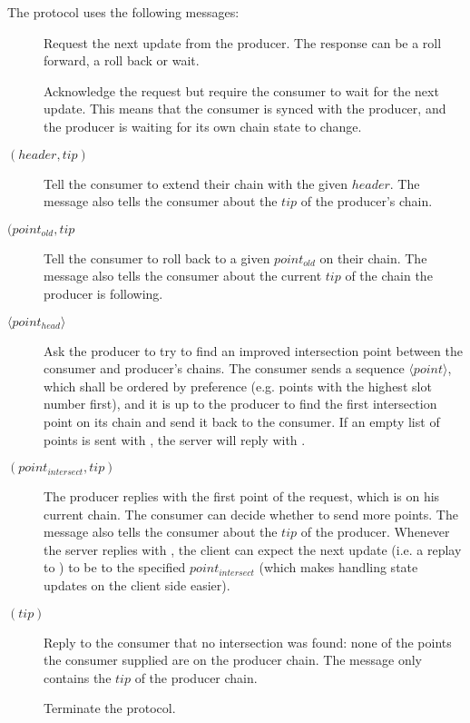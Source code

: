 The protocol uses the following messages:
\begin{description}
\item [\MsgRequestNext]
      Request the next update from the producer.  The response can be a roll
      forward, a roll back or wait.
\item [\MsgAwaitReply]
      Acknowledge the request but require the consumer to wait for the next update.
      This means that the consumer is synced with the producer, and
      the producer is waiting for its own chain state to change.
\item [\MsgRollForward{} {\boldmath $(header, tip)$}]
      Tell the consumer to extend their chain with the given $header$.
      The message also tells the consumer about the $tip$ of the producer's chain.
\item [\MsgRollBackward{} {\boldmath $(point_{old}, tip$}]
      Tell the consumer to roll back to a given $point_{old}$ on their chain.
      The message also tells the consumer about the current  $tip$ of the chain the producer is following.
\item [\MsgFindIntersect{} {\boldmath $\langle point_{head} \rangle $}]
      Ask the producer to try to find an improved intersection point between
      the consumer and producer's chains.
      The consumer sends a sequence {\boldmath $\langle point \rangle $}, which
      shall be ordered by preference (e.g. points with the highest slot number
      first), and it is up to the producer to find the first intersection point
      on its chain and send it back to the consumer.  If an empty list of
      points is sent with \MsgFindIntersect{}, the server will reply with
      \MsgIntersectNotFound{}.
\item [\MsgIntersectFound{} {\boldmath $(point_{intersect} ,tip)$}]
      The producer replies with the first point of the request, which is on his current chain.
      The consumer can decide whether to send more points.
      The message also tells the consumer about the $tip$ of the producer.
      Whenever the server replies with \MsgIntersectFound{}, the client can
      expect the next update (i.e. a replay to \MsgRequestNext{}) to be
      \MsgRollBackward{} to the specified $point_{intersect}$ (which makes
      handling state updates on the client side easier).
\item [\MsgIntersectNotFound{} {\boldmath $(tip)$}]
      Reply to the consumer that no intersection was found: none of the
      points the consumer supplied are on the producer chain.
      The message only contains the $tip$ of the producer chain.
\item [\MsgDone]
      Terminate the protocol.
\end{description}

